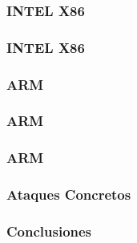 \documentclass{beamer}
\begin{document}
\begin{frame}
    \frametitle{INTEL X86}
\end{frame}

\begin{frame}
    \frametitle{INTEL X86}
\end{frame}

\begin{frame}
    \frametitle{ARM}
\end{frame}

\begin{frame}
    \frametitle{ARM}
\end{frame}

\begin{frame}
    \frametitle{ARM}
\end{frame}

\begin{frame}
    \frametitle{Ataques Concretos}
\end{frame}

\begin{frame}
    \frametitle{Conclusiones}
\end{frame}
\end{document}

